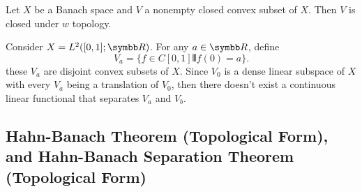 \begin{corollary}
  Let $X$ be a Banach space and $V$ a nonempty closed convex subset of $X$. Then $V$ is closed under $w$ topology.
\end{corollary}

\begin{example}
  Consider $X=L^2([0, 1]; \RR)$. For any $a\in\RR$, define
  \begin{equation*}
    V_a = \{f\in C[0, 1]\VERT f(0)=a\}.
  \end{equation*}
  these $V_a$ are disjoint convex subsets of $X$. Since $V_0$ is a dense linear subspace of $X$ with every $V_a$ being a translation of $V_0$, then there doesn't exist a continuous linear functional that separates $V_a$ and $V_b$.
\end{example}

\subsection{Hahn-Banach Theorem (Topological Form), and Hahn-Banach Separation Theorem (Topological Form)}

